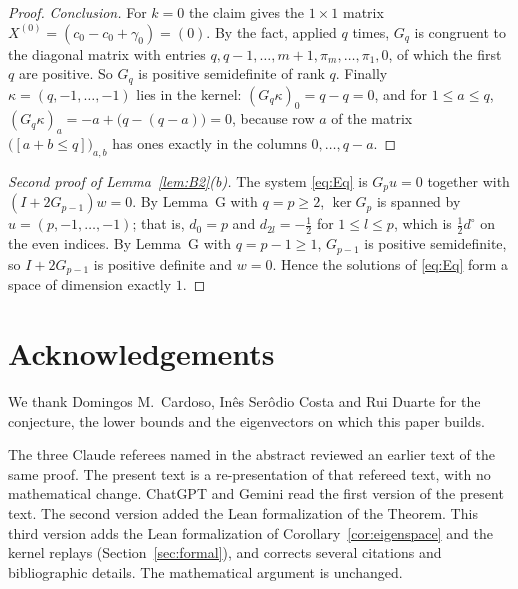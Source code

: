 \documentclass[11pt]{amsart}
\theoremstyle{plain}
\theoremstyle{definition}
\theoremstyle{remark}
\numberwithin{equation}{section}
\newcommand{\iv}[1]{[#1]}              %
\newcommand{\dc}{d^{\circ}}
\begin{document}
\begin{proof}
\emph{Conclusion.} For \(k=0\) the claim gives the \(1\times1\) matrix
\(X^{(0)}=(c_0-c_0+\gamma_0)=(0)\). By the fact, applied \(q\) times, \(G_q\) is
congruent to the diagonal matrix with entries \(q,q-1,\dots,m+1,\pi_m,\dots,\pi_1,0\),
of which the first \(q\) are positive. So \(G_q\) is positive semidefinite of rank
\(q\). Finally \(\kappa=(q,-1,\dots,-1)\) lies in the kernel: \((G_q\kappa)_0=q-q=0\),
and for \(1\le a\le q\), \((G_q\kappa)_a=-a+\bigl(q-(q-a)\bigr)=0\), because row \(a\)
of the matrix \(\bigl(\iv{a+b\le q}\bigr)_{a,b}\) has ones exactly in the columns
\(0,\dots,q-a\).
\end{proof}

\begin{proof}[Second proof of Lemma~\ref{lem:B2}(b)]
The system \eqref{eq:Eq} is \(G_pu=0\) together with \((I+2G_{p-1})w=0\). By Lemma~G
with \(q=p\ge2\), \(\ker G_p\) is spanned by \(u=(p,-1,\dots,-1)\); that is,
\(d_0=p\) and \(d_{2l}=-\frac12\) for \(1\le l\le p\), which is \(\frac12\dc\) on the
even indices. By Lemma~G with \(q=p-1\ge1\), \(G_{p-1}\) is positive semidefinite, so
\(I+2G_{p-1}\) is positive definite and \(w=0\). Hence the solutions of \eqref{eq:Eq}
form a space of dimension exactly \(1\).
\end{proof}

\section*{Acknowledgements}

We thank Domingos M.~Cardoso, In\^es Ser\^odio Costa and Rui Duarte for the conjecture,
the lower bounds and the eigenvectors on which this paper builds.

The three Claude referees named in the abstract reviewed an earlier text of the same
proof. The present text is a re-presentation of that refereed text, with no mathematical
change. ChatGPT and Gemini read the first version of the present text. The second version
added the Lean formalization of the Theorem. This third version adds the Lean
formalization of Corollary~\ref{cor:eigenspace} and the kernel replays
(Section~\ref{sec:formal}), and corrects several citations and bibliographic details. The
mathematical argument is unchanged.
\end{document}
